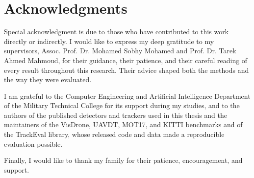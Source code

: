 \chapter*{Acknowledgments}

Special acknowledgment is due to those who have contributed to this work directly or indirectly. I would like to express my deep gratitude to my supervisors, Assoc. Prof. Dr. Mohamed Sobhy Mohamed and Prof. Dr. Tarek Ahmed Mahmoud, for their guidance, their patience, and their careful reading of every result throughout this research. Their advice shaped both the methods and the way they were evaluated.

I am grateful to the Computer Engineering and Artificial Intelligence Department of the Military Technical College for its support during my studies, and to the authors of the published detectors and trackers used in this thesis and the maintainers of the VisDrone, UAVDT, MOT17, and KITTI benchmarks and of the TrackEval library, whose released code and data made a reproducible evaluation possible.

Finally, I would like to thank my family for their patience, encouragement, and support.
